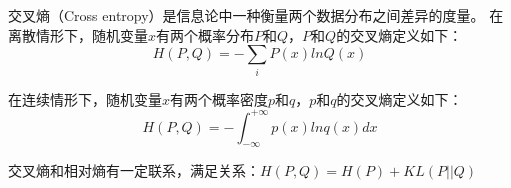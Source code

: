 
交叉熵（Cross entropy）是信息论中一种衡量两个数据分布之间差异的度量。
在离散情形下，随机变量$x$有两个概率分布$P$和$Q$，$P$和$Q$的交叉熵定义如下：
\begin{equation}
H(P,Q)=-\sum_iP(x)lnQ(x)
\end{equation}

在连续情形下，随机变量$x$有两个概率密度$p$和$q$，$p$和$q$的交叉熵定义如下：
\begin{equation}
H(P,Q)=- \int_{-\infty}^{+\infty}p(x)lnq(x)dx
\end{equation}

交叉熵和相对熵有一定联系，满足关系：$H(P,Q)=H(P)+KL(P||Q)$